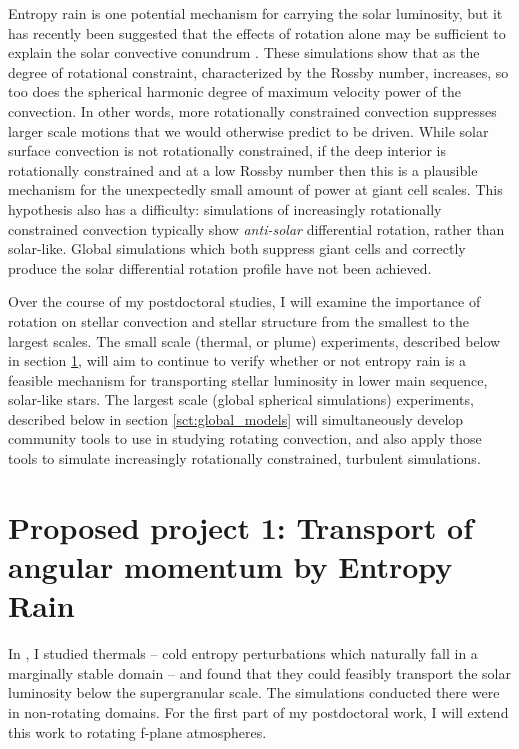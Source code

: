 \documentclass[aasms,12pt]{article}
\begin{document}
Entropy rain is one potential mechanism for carrying the solar luminosity, but it has recently been suggested that the effects of rotation alone may be sufficient to explain the solar convective conundrum \citep{featherstone&hindman2016}.
These simulations show that as the degree of rotational constraint, characterized by the Rossby number, increases, so too does the spherical harmonic degree of maximum velocity power of the convection.
In other words, more rotationally constrained convection suppresses larger scale motions that we would otherwise predict to be driven.
While solar surface convection is not rotationally constrained, if the deep interior is rotationally constrained and at a low Rossby number then this is a plausible mechanism for the unexpectedly small amount of power at giant cell scales.
This hypothesis also has a difficulty: simulations of increasingly rotationally constrained convection typically show \emph{anti-solar} differential rotation, rather than solar-like.
Global simulations which both suppress giant cells and correctly produce the solar differential rotation profile have not been achieved.

Over the course of my postdoctoral studies, I will examine the importance of rotation on stellar convection and stellar structure from the smallest to the largest scales.
The small scale (thermal, or plume) experiments, described below in section \ref{sct:thermals}, will aim to continue to verify whether or not entropy rain is a feasible mechanism for transporting stellar luminosity in lower main sequence, solar-like stars.
The largest scale (global spherical simulations) experiments, described below in section \ref{sct:global_models} will simultaneously develop community tools to use in studying rotating convection, and also apply those tools to simulate increasingly rotationally constrained, turbulent simulations.


\section{Proposed project 1: Transport of angular momentum by Entropy Rain}
\label{sct:thermals}
In \citet{andersLB2019}, I studied thermals -- cold entropy perturbations which naturally fall in a marginally stable domain -- and found that they could feasibly transport the solar luminosity below the supergranular scale.
The simulations conducted there were in non-rotating domains.
For the first part of my postdoctoral work, I will extend this work to rotating f-plane atmospheres.
\end{document}
